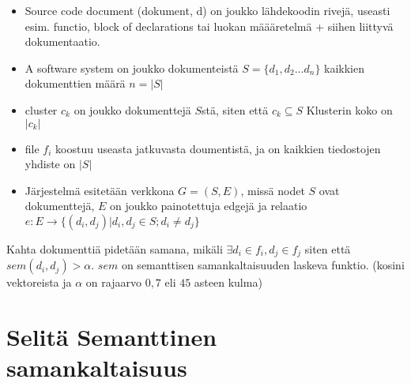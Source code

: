 \documentclass[finnish]{../tktltiki2}
\theoremstyle{definition}
\theoremstyle{remark}
\begin{document}
\begin{itemize}
  \item Source code document (dokument, d)
    on joukko lähdekoodin rivejä, useasti esim. functio, block of declarations tai luokan määäretelmä + siihen liittyvä
    dokumentaatio.

  \item A software system
    on joukko dokumenteistä $S = \{d_1,d_2\dots d_n\}$ %
    kaikkien dokumenttien määrä $n = |S|$

  \item cluster $c_k$
  on joukko dokumenttejä $S$stä, siten että $c_k \subseteq S$ Klusterin koko on $|c_k|$

  \item file $f_i$
    koostuu useasta jatkuvasta doumentistä, ja on kaikkien tiedostojen yhdiste on $|S|$

  \item Järjestelmä esitetään verkkona
    $G=(S,E)$, missä nodet $S$ ovat dokumenttejä, $E$ on joukko painotettuja edgejä ja relaatio
    $e: E \to \{(d_i,d_j) | d_i, d_j \in S; d_i \neq d_j  \}$

\end{itemize}
Kahta dokumenttiä pidetään samana, mikäli $\exists d_i \in f_i, d_j \in f_j $ siten että $sem(d_i, d_j) > \alpha$.
$sem$ on semanttisen samankaltaisuuden laskeva funktio. (kosini vektoreista ja $\alpha$ on rajaarvo $0,7$ eli $45$
asteen kulma)







\section{Selitä Semanttinen samankaltaisuus}



















\end{document}
